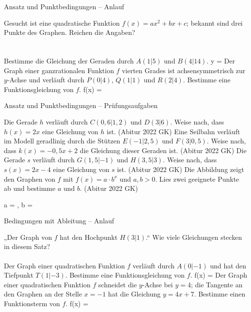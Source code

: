 \setcounter{aufgabe}{13}

\begin{aufgabe}{Ansatz und Punktbedingungen – Anlauf}
\begin{teile}
\teil Gesucht ist eine quadratische Funktion $f(x) = ax^2 + bx + c$; bekannt sind drei Punkte des Graphen. Reichen die Angaben? \\  \\  \\ 
\teil Bestimme die Gleichung der Geraden durch $A(1|5)$ und $B(4|14)$. y = \leerfeld
\teil Der Graph einer ganzrationalen Funktion $f$ vierten Grades ist achsensymmetrisch zur $y$-Achse und verläuft durch $P(0|4)$, $Q(1|1)$ und $R(2|4)$. Bestimme eine Funktionsgleichung von $f$. f(x) = \leerfeld
\end{teile}
\end{aufgabe}

\begin{aufgabe}{Ansatz und Punktbedingungen – Prüfungsaufgaben}
\begin{teile}
\teil Die Gerade $h$ verläuft durch $C(0{,}6|1{,}2)$ und $D(3|6)$. Weise nach, dass $h(x) = 2x$ eine Gleichung von $h$ ist. \hfill (Abitur 2022 GK)
\teil Eine Seilbahn verläuft im Modell geradlinig durch die Stützen $E(-1|2{,}5)$ und $F(3|0{,}5)$. Weise nach, dass $k(x) = -0{,}5x + 2$ die Gleichung dieser Geraden ist. \hfill (Abitur 2022 GK)
\teil Die Gerade $s$ verläuft durch $G(1{,}5|-1)$ und $H(3{,}5|3)$. Weise nach, dass $s(x) = 2x - 4$ eine Gleichung von $s$ ist. \hfill (Abitur 2022 GK)
\teil Die Abbildung zeigt den Graphen von $f$ mit $f(x) = a \cdot b^x$ und $a, b > 0$. Lies zwei geeignete Punkte ab und bestimme $a$ und $b$. \hfill (Abitur 2022 GK) \\

\begin{ksys}[xmin=-3,xmax=2,ymin=0,ymax=7,ablesen]  \end{ksys}
a = \leerfeld , b = \leerfeld
\end{teile}
\end{aufgabe}

\begin{aufgabe}{Bedingungen mit Ableitung – Anlauf}
\begin{teile}
\teil „Der Graph von $f$ hat den Hochpunkt $H(3|1)$.“ Wie viele Gleichungen stecken in diesem Satz? \\  \\ 
\teil Der Graph einer quadratischen Funktion $f$ verläuft durch $A(0|-1)$ und hat den Tiefpunkt $T(1|-3)$. Bestimme eine Funktionsgleichung von $f$. f(x) = \leerfeld
\teil Der Graph einer quadratischen Funktion $f$ schneidet die $y$-Achse bei $y = 4$; die Tangente an den Graphen an der Stelle $x = -1$ hat die Gleichung $y = 4x + 7$. Bestimme einen Funktionsterm von $f$. f(x) = \leerfeld
\end{teile}
\end{aufgabe}


